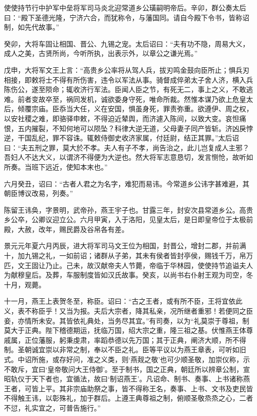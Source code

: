 \documentclass[12pt,UTF8]{ctexbook}
\begin{document}
使使持节行中护军中垒将军司马炎北迎常道乡公璜嗣明帝后。辛卯，群公奏太后曰：“殿下圣德光隆，宁济六合，而犹称令，与藩国同。请自今殿下令书，皆称诏制，如先代故事。”

癸卯，大将车固让相国、晋公、九锡之宠。太后诏曰：“夫有功不隐，周易大义，成人之美，古贤所尚，今听所执，出表示外，以章公之谦光焉。”

戊申，大将军文王上言：“高贵乡公率将从驾人兵，拔刃鸣金鼓向臣所止；惧兵刃相接，即敕将士不得有所伤害，违令以军法从事。骑督成倅弟太子舍人济，横入兵陈伤公，遂至陨命；辄收济行军法。臣闻人臣之节，有死无二，事上之义，不敢逃难。前者变故卒至，祸同发机，诚欲委身守死，唯命所裁。然惟本谋乃欲上危皇太后，倾覆宗庙。臣忝当大任，义在安国，惧虽身死，罪责弥重。欲遵伊、周之权，以安社稷之难，即骆驿申敕，不得迫近辇舆，而济遽入陈间，以致大变。哀怛痛恨，五内摧裂，不知何地可以陨坠？科律大逆无道，父母妻子同产皆斩。济凶戾悖逆，干国乱纪，罪不容诛。辄敕侍御史收济家属，付廷尉，结正其罪。”太后诏曰：“夫五刑之罪，莫大於不孝。夫人有子不孝，尚告治之，此儿岂复成人主邪？吾妇人不达大义，以谓济不得便为大逆也。然大将军志意恳切，发言恻怆，故听如所奏。当班下远近，使知本末也。”

六月癸丑，诏曰：“古者人君之为名字，难犯而易讳。今常道乡公讳字甚难避，其朝臣博议改易，列奏。”

陈留王讳奂，字景明，武帝孙，燕王宇子也。甘露三年，封安次县常道乡公。高贵乡公卒，公卿议迎立公。六月甲寅，入于洛阳，见皇太后，是日即皇帝位于太极前殿，大赦，改年，赐民爵及谷帛各有差。

景元元年夏六月丙辰，进大将军司马文王位为相国，封晋公，增封二郡，并前满十，加九锡之礼，一如前诏；诸群从子弟，其未有侯者皆封亭侯，赐钱千万，帛万匹，文王固让乃止。己未，故汉献帝夫人节薨，帝临于华林园，使使持节追谥夫人为献穆皇后。及葬，车服制度皆如汉氏故事。癸亥，以尚书右仆射王观为司空，冬十月，观薨。

十一月，燕王上表贺冬至，称臣。诏曰：“古之王者，或有所不臣，王将宜依此义，表不称臣乎！又当为报。夫后大宗者，降其私亲，况所继者重邪！若便同之臣妾，亦情所未安。其皆依礼典处，当务尽其宜。”有司奏，以为“礼莫崇于尊祖，制莫大于正典。陛下稽德期运，抚临万国，绍大宗之重，隆三祖之基。伏惟燕王体尊戚属，正位藩服，躬秉虔肃，率蹈恭德以先万国；其于正典，阐济大顺，所不得制。圣朝诚宜崇以非常之制，奉以不臣之礼。臣等平议以为燕王章表，可听如旧式。中诏所施，或存好问，准之义类，则‘燕觌之敬’也可少顺圣敬，加崇仪称，示不敢斥，宜曰‘皇帝敬问大王侍御’。至于制书，国之正典，朝廷所以辨章公制，宣昭轨仪于天下者也，宜循法，故曰‘制诏燕王’。凡诏命、制书、奏事、上书诸称燕王者，可皆上平。其非宗庙助祭之事，皆不得称王名，奏事、上书、文书及吏民皆不得触王讳，以彰殊礼，加于群后。上遵王典尊祖之制，俯顺圣敬烝烝之心，二者不愆，礼实宜之，可普告施行。”
\end{document}
